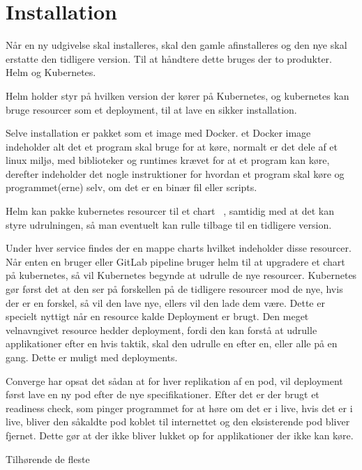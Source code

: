 \section{Installation}

Når en ny udgivelse skal installeres, skal den gamle afinstalleres og den nye skal erstatte den tidligere version. Til at håndtere dette bruges der to produkter. Helm og Kubernetes.

Helm holder styr på hvilken version der kører på Kubernetes, og kubernetes kan bruge resourcer som et deployment, til at lave en sikker installation.

Selve installation er pakket som et image med Docker. et Docker image indeholder alt det et program skal bruge for at køre, normalt er det dele af et linux miljø, med biblioteker og runtimes krævet for at et program kan køre, derefter indeholder det nogle instruktioner for hvordan et program skal køre og programmet(erne) selv, om det er en binær fil eller scripts.

Helm kan pakke kubernetes resourcer til et chart ~\cite[Chart]{helm_chart}, samtidig med at det kan styre udrulningen, så man eventuelt kan rulle tilbage til en tidligere version.

Under hver service findes der en mappe charts hvilket indeholder disse resourcer. Når enten en bruger eller GitLab pipeline bruger helm til at upgradere et chart på kubernetes, så vil Kubernetes begynde at udrulle de nye resourcer. Kubernetes gør først det at den ser på forskellen på de tidligere resourcer mod de nye, hvis der er en forskel, så vil den lave nye, ellers vil den lade dem være. Dette er specielt nyttigt når en resource kalde Deployment er brugt. Den meget velnavngivet resource hedder deployment, fordi den kan forstå at udrulle applikationer efter en hvis taktik, skal den udrulle en efter en, eller alle på en gang. Dette er muligt med deployments.

Converge har opsat det sådan at for hver replikation af en pod, vil deployment først lave en ny pod efter de nye specifikationer. Efter det er der brugt et readiness check, som pinger programmet for at høre om det er i live, hvis det er i live, bliver den såkaldte pod koblet til internettet og den eksisterende pod bliver fjernet. Dette gør at der ikke bliver lukket op for applikationer der ikke kan køre.

Tilhørende de fleste ~\cite[Docker]{documentation_terms}